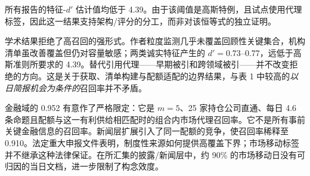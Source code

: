 \documentclass[
  chinese,
  conference,10pt]{IEEEtran}
\begin{document}
\begin{table}[t]
\centering
\footnotesize
\setlength{\tabcolsep}{3pt}
\caption{表 2. 冻结的真实语料试点口径与边界证据。}
\end{table}

所有报告的特征-\(d'\) 估计值均低于 4.39。由于该阈值是高斯特例，且试点使用代理标签，因此这一结果支持架构/评分的分工，而非对该恒等式的独立证明。

学术结果拒绝了高召回的强形式。作者粒度监测几乎未覆盖回顾性关键集合，机构清单虽改善覆盖但仍对容量敏感；两类诚实特征产生的 \(d'=0.73\)--\(0.77\)，远低于高斯准则所要求的 4.39。替代引用代理------早期被引和跨领域被引------并不改变拒绝的方向。这是关于获取、清单构建与配额适配的边界结果，与表 1 中较高的\emph{以日简报机会为条件的}召回率并不矛盾。

金融域的 0.952 有意作了严格限定：它是 \(m=5\)、25 家持仓公司直通、每日 4.6 条命题且配额与这一有利供给相匹配时的组合内市场代理召回率。它不是所有事前关键金融信息的召回率。新闻层扩展引入了同一配额的竞争，使召回率稀释至 0.910。法定重大申报文件表明，制度性来源如何提供高覆盖下界；市场移动标签并不继承这种法律保证。在所汇集的披露/新闻层中，约 90\% 的市场移动日没有可归因的当日文档，进一步限制了构念效度。
\end{document}
